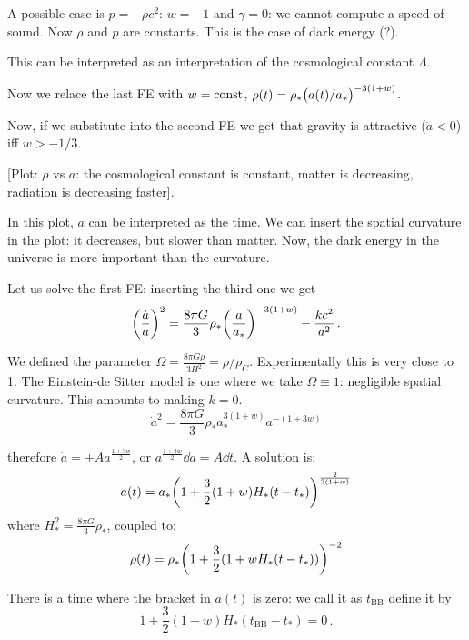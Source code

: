 \documentclass[main.tex]{subfiles}
\begin{document}
A possible case is \(p = - \rho c^2\): \(w = -1\) and \(\gamma = 0\): we cannot compute a speed of sound. Now \(\rho\) and \(p\) are constants. This is the case of dark energy (?).

This can be interpreted as an interpretation of the cosmological constant \(\Lambda\).

Now we relace the last FE with \(w = \text{const}\), \(\rho(t) = \rho_{*} \qty(a(t) / a_{*})^{-3(1+w)}  \).

Now, if we substitute into the second FE we get that gravity is attractive (\(\ddot{a} < 0 \)) iff \(w > -1/3\). 

[Plot: \(\rho\) vs \(a\): the cosmological constant is constant, matter is decreasing, radiation is decreasing faster].

In this plot, \(a\) can be interpreted as the time.
We can insert the spatial curvature in the plot: it decreases, but slower than matter. 
Now, the dark energy in the universe is more important than the curvature. 

Let us solve the first FE: inserting the third one we get
\begin{equation}
  \qty(\frac{\dot{a} }{a})^2 = 
  \frac{8 \pi G}{3} \rho_* \qty(\frac{a}{a_*}) ^{-3 (1+w)} - \frac{kc^2}{a^2}\,.
\end{equation}

We defined the parameter \(\Omega = \frac{8 \pi G \rho}{3 H^2} = \rho / \rho_C\).
Experimentally this is very close to 1.
The Einstein-de Sitter model is one where we take \(\Omega \equiv 1\): negligible spatial curvature. This amounts to making \(k=0\).
\begin{equation}
  \dot{a}^2 = \frac{8 \pi G}{3} \rho_* a_{*}^{3 (1+w)} a^{-(1+3w)}
\end{equation}

therefore \(\dot{a} = \pm A a^{\frac{1+3w}{2}}\), or \(a ^{\frac{1+3w}{2}}\dd{a} = A \dd{t}\). A solution is:
\begin{equation}
  a(t)= a_{*} \qty(
    1 + \frac{3}{2} (1+w) H_{*} (t - t_{*})
  )^{\frac{2}{3(1+w)}}
\end{equation}
where \(H_{*}^2 = \frac{8 \pi G}{3} \rho_{*}\), coupled to:
\begin{equation}
  \rho(t) = \rho_{*} \qty(1 + \frac{3}{2}(1+w H_* (t-t_*)))^{-2}
\end{equation}

There is a time where the bracket in \(a(t)\) is zero: we call it as \(t_{\text{BB}}\) define it by
\begin{equation}
  1 + \frac{3}{2} (1+w) H_{*} (t_{\text{BB}} - t_* ) = 0\,.
\end{equation}
\end{document}
